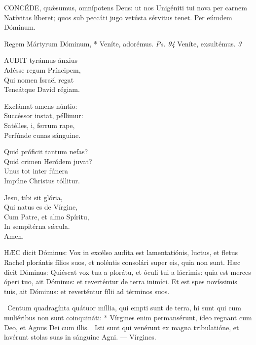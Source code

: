 \lettrine[lines=2]{C}{ONCÉDE}, quǽsumus, omnípotens Deus: ut nos Unigéniti tui nova per carnem Natívitas líberet; quos sub peccáti jugo vetústa sérvitus tenet. Per eúmdem Dóminum.


 Regem Mártyrum Dóminum, * Veníte, adorémus. \textit{Ps. 94} Veníte, exsultémus. \textit{3}


\lettrine[lines=2]{A}{UDIT} tyránnus ánxius\\
Adésse regum Príncipem,\\
Qui nomen Israël regat\\
Teneátque David régiam.

Exclámat amens núntio:\\
Succéssor instat, péllimur:\\
Satélles, i, ferrum rape,\\
Perfúnde cunas sánguine.

Quid próficit tantum nefas?\\
Quid crimen Heródem juvat?\\
Unus tot inter fúnera\\
Impúne Christus tóllitur.

Jesu, tibi sit glória,\\
Qui natus es de Vírgine,\\
Cum Patre, et almo Spíritu,\\
In sempitérna sǽcula.\\
Amen.




\lettrine[lines=2]{H}{ÆC} dicit Dóminus: Vox in excélso audíta est lamentatiónis, luctus, et fletus Rachel plorántis fílios suos, et noléntis consolári super eis, quia non sunt. Hæc dicit Dóminus: Quiéscat vox tua a plorátu, et óculi tui a lácrimis: quia est merces óperi tuo, ait Dóminus: et reverténtur de terra inimíci. Et est spes novíssimis tuis, ait Dóminus: et reverténtur fílii ad términos suos.

\R\ Centum quadragínta quátuor míllia, qui empti sunt de terra, hi sunt qui cum muliéribus non sunt coinquináti: * Vírgines enim permansérunt, ídeo regnant cum Deo, et Agnus Dei cum illis. \V\ Isti sunt qui venérunt ex magna tribulatióne, et lavérunt stolas suas in sánguine Agni. --- Vírgines.

